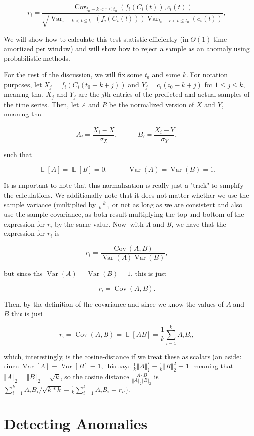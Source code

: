 \documentclass{article}
\newcommand{\norm}[1]{\left\Vert #1 \right\Vert}
\DeclareMathOperator{\E}{\mathbb{E}}
\DeclareMathOperator{\Cov}{\mathrm{Cov}}
\DeclareMathOperator{\Var}{\mathrm{Var}}
\begin{document}
$$r_i = \frac{\Cov_{t_0 - k < t \le t_0}(f_i(C_i(t)), c_i(t))}{\sqrt{\Var_{t_0 - k < t \le t_0}(f_i(C_i(t)))\Var_{t_0 - k < t \le t_0}(c_i(t))}},$$

We will show how to calculate this test statistic efficiently (in $\Theta(1)$ time amortized per window) and will show how to reject a sample as an anomaly using probabilistic methods.

For the rest of the discussion, we will fix some $t_0$ and some $k$. For notation purposes, let $X_j = f_i(C_i(t_0 - k + j))$ and $Y_j = c_i(t_0 - k + j)$ for $1 \le j \le k$, meaning that $X_j$ and $Y_j$ are the $j$th entries of the predicted and actual samples of the time series. Then, let $A$ and $B$ be the normalized version of $X$ and $Y$, meaning that

$$A_i = \frac{X_i - \bar X}{\sigma_X},
~~~~~~~~~~~~~
B_i = \frac{X_i - \bar Y}{\sigma_Y},$$

such that

$$\E[A] = \E[B] = 0,
~~~~~~~~~~~~~
\Var(A) = \Var(B) = 1.$$

It is important to note that this normalization is really just a "trick" to simplify the calculations. We additionally note that it does not matter whether we use the sample variance (multiplied by $\frac{k}{k - 1}$ or not as long as we are consistent and also use the sample covariance, as both result multiplying the top and bottom of the expression for $r_i$ by the same value. Now, with $A$ and $B$, we have that the expression for $r_i$ is

$$r_i = \frac{\Cov(A, B)}{\Var(A)\Var(B)},$$

but since the $\Var(A) = \Var(B) = 1$, this is just

$$r_i = \Cov(A, B).$$

Then, by the definition of the covariance and since we know the values of $A$ and $B$ this is just

$$r_i = \Cov(A, B) = \E[AB] = \frac{1}{k} \sum_{i = 1}^k A_i B_i,$$

which, interestingly, is the cosine-distance if we treat these as scalars (an aside: since $\Var[A] = \Var[B] = 1$, this says $\frac{1}{k} \norm{A}_2^2 = \frac{1}{k} \norm{B}_2^2 = 1$, meaning that $\norm{A}_2 = \norm{B}_2 = \sqrt{k}$, so the cosine distance $\frac{A \cdot B}{\norm{A}_2 \norm{B}_2}$ is $\sum_{i = 1}^k A_i B_i / \sqrt{k * k} = \frac{1}{k} \sum_{i = 1}^k A_i B_i = r_i.$).

\section{Detecting Anomalies}
\end{document}
